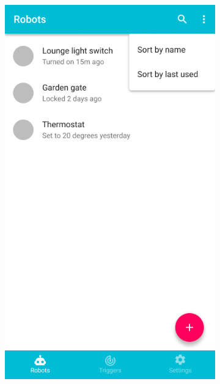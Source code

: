 \documentclass[onecolumn]{IEEEtran}
\begin{document}
\begin{figure}[H]
\begin{subfigure}{.33\textwidth}
        \includegraphics[width=.9\linewidth]{images/app-2.png}
    \end{subfigure}
    \begin{subfigure}{.33\textwidth}
        \centering

\end{subfigure}
\end{figure}
\end{document}
